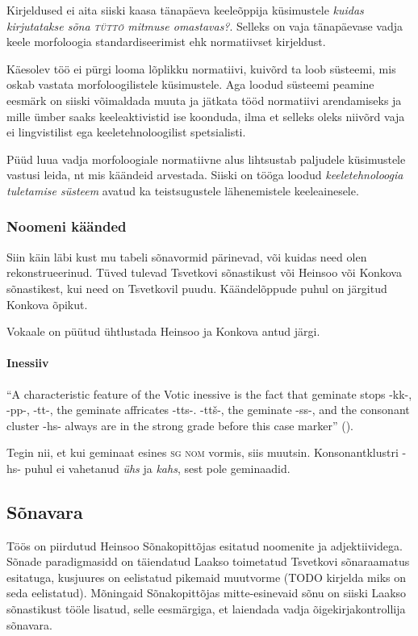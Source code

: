 \documentclass[12pt,a4paper]{article}
\begin{document}
Kirjeldused ei aita siiski kaasa tänapäeva keeleõppija küsimustele \textit{kuidas kirjutatakse sõna \textsc{tüttö} mitmuse omastavas?}. Selleks on vaja tänapäevase vadja keele morfoloogia standardiseerimist ehk normatiivset kirjeldust.

Käesolev töö ei pürgi looma lõplikku normatiivi, kuivõrd ta loob süsteemi, mis oskab vastata morfoloogilistele küsimustele. Aga loodud süsteemi peamine eesmärk on siiski võimaldada muuta ja jätkata tööd normatiivi arendamiseks ja mille ümber saaks keeleaktivistid ise koonduda, ilma et selleks oleks niivõrd vaja ei lingvistilist ega keeletehnoloogilist spetsialisti.

Püüd luua vadja morfoloogiale normatiivne alus lihtsustab paljudele küsimustele vastusi leida, nt mis käändeid arvestada. Siiski on tööga loodud \textit{keele\-tehnoloogia tuletamise süsteem} avatud ka teistsugustele lähenemistele keeleainesele.

\subsubsection{Noomeni käänded}

Siin käin läbi kust mu tabeli sõnavormid pärinevad, või kuidas need olen rekonstrueerinud. Tüved tulevad Tsvetkovi sõnastikust või Heinsoo või Konkova sõnastikest, kui need on Tsvetkovil puudu. Käändelõppude puhul on järgitud Konkova õpikut.

Vokaale on püütud ühtlustada Heinsoo ja Konkova antud järgi.

\paragraph{Inessiiv}

``A characteristic feature of the Votic inessive is the fact that
geminate stops -kk-, -pp-, -tt-, the geminate affricates -tts-.
-ttš-, the geminate -ss-, and the consonant cluster -hs- always
are in the strong grade before this case marker'' (\cite[23]{ariste_grammar_1968}).

Tegin nii, et kui geminaat esines \textsc{sg nom} vormis, siis muutsin. Konsonant\-klustri -hs- puhul ei vahetanud \textit{ühs} ja \textit{kahs}, sest pole geminaadid.

\subsection{Sõnavara}
\label{sec:sõnavara}
Töös on piirdutud Heinsoo Sõnakopittõjas esitatud noomenite ja adjektiividega. Sõnade paradigmasidd on täiendatud Laakso toimetatud Tsvetkovi sõnaraamatus esitatuga, kusjuures on eelistatud pikemaid muutvorme (TODO kirjelda miks on seda eelistatud). Mõningaid Sõnakopittõjas mitte-esinevaid sõnu on siiski Laakso sõnastikust tööle lisatud, selle eesmärgiga, et laiendada vadja õigekirjakontrollija sõnavara.
\end{document}
